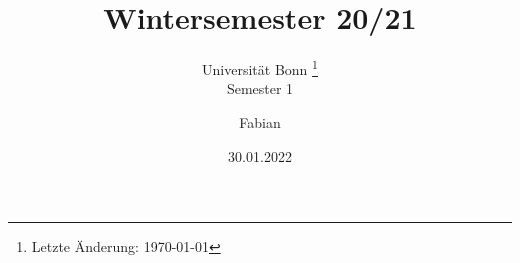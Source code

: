 \documentclass[a4paper, 10pt, oneside, openany,  bibliography=totocnumbered]{scrbook}
\begin{document}
\subject{Vorlesungsmitschriften}
\title{Wintersemester 20/21}
\subtitle{
  Universität Bonn \footnote{
   \centering
	  Letzte Änderung: \today
  }
  \\
  Semester 1
}
\author{Fabian}
\date{30.01.2022}
\publishers{
  Online aufrufbar auf \texttt{\url{https://github.com/git-fabus/lecutres/blob/main/notes.pdf}.}
  \\
 Veränderungsvorschläge und Verbesserungen bitte an 
}

\frontmatter
\maketitle

\tableofcontents

\mainmatter


\appendix %
%

\backmatter
%
\end{document}
